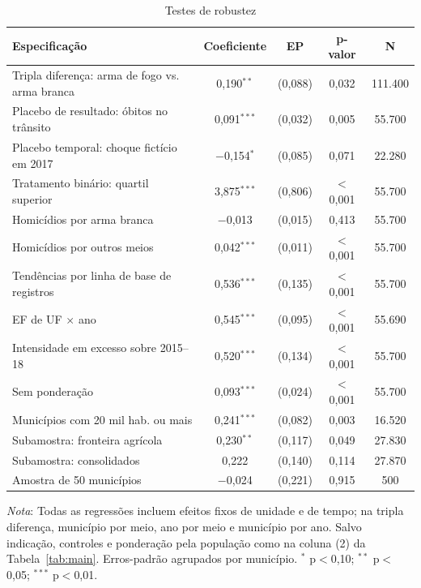 \documentclass[11pt,a4paper]{article}
\newcommand{\nota}[1]{\par\vspace{2pt}\begin{minipage}{\linewidth}\footnotesize\textit{Nota}: #1\end{minipage}}
\begin{document}
\begin{table}[H]
\centering\small
\caption{Testes de robustez}\label{tab:rob}
\begin{tabular}{lcccc}
\toprule
Especificação & Coeficiente & EP & p-valor & N \\
\midrule
Tripla diferença: arma de fogo vs. arma branca & 0{,}190$^{**}$ & (0{,}088) & 0{,}032 & 111.400 \\
Placebo de resultado: óbitos no trânsito & 0{,}091$^{***}$ & (0{,}032) & 0{,}005 & 55.700 \\
Placebo temporal: choque fictício em 2017 & $-$0{,}154$^{*}$ & (0{,}085) & 0{,}071 & 22.280 \\
Tratamento binário: quartil superior & 3{,}875$^{***}$ & (0{,}806) & $<$0{,}001 & 55.700 \\
Homicídios por arma branca & $-$0{,}013 & (0{,}015) & 0{,}413 & 55.700 \\
Homicídios por outros meios & 0{,}042$^{***}$ & (0{,}011) & $<$0{,}001 & 55.700 \\
Tendências por linha de base de registros & 0{,}536$^{***}$ & (0{,}135) & $<$0{,}001 & 55.700 \\
EF de UF $\times$ ano & 0{,}545$^{***}$ & (0{,}095) & $<$0{,}001 & 55.690 \\
Intensidade em excesso sobre 2015--18 & 0{,}520$^{***}$ & (0{,}134) & $<$0{,}001 & 55.700 \\
Sem ponderação & 0{,}093$^{***}$ & (0{,}024) & $<$0{,}001 & 55.700 \\
Municípios com 20 mil hab. ou mais & 0{,}241$^{***}$ & (0{,}082) & 0{,}003 & 16.520 \\
Subamostra: fronteira agrícola & 0{,}230$^{**}$ & (0{,}117) & 0{,}049 & 27.830 \\
Subamostra: consolidados & 0{,}222 & (0{,}140) & 0{,}114 & 27.870 \\
Amostra de 50 municípios & $-$0{,}024 & (0{,}221) & 0{,}915 & 500 \\
\bottomrule
\end{tabular}
\nota{Todas as regressões incluem efeitos fixos de unidade e de tempo; na tripla diferença, município por meio, ano por meio e município por ano. Salvo indicação, controles e ponderação pela população como na coluna (2) da Tabela~\ref{tab:main}. Erros-padrão agrupados por município. $^{*}$ p$<$0,10; $^{**}$ p$<$0,05; $^{***}$ p$<$0,01.}
\end{table}
\end{document}
